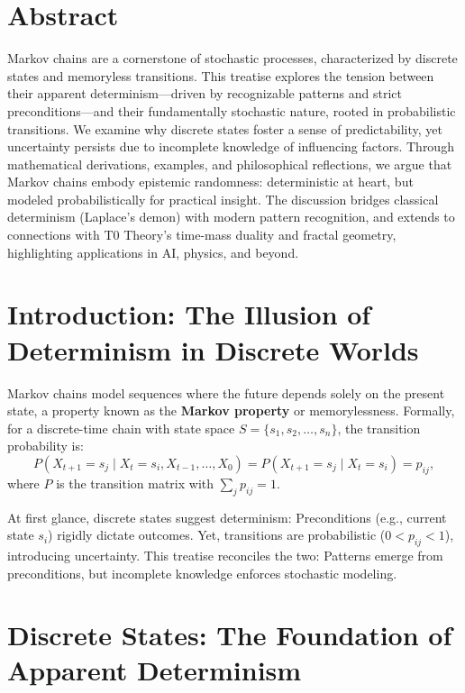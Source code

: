 \section*{Abstract}
		Markov chains are a cornerstone of stochastic processes, characterized by discrete states and memoryless transitions. This treatise explores the tension between their apparent determinism—driven by recognizable patterns and strict preconditions—and their fundamentally stochastic nature, rooted in probabilistic transitions. We examine why discrete states foster a sense of predictability, yet uncertainty persists due to incomplete knowledge of influencing factors. Through mathematical derivations, examples, and philosophical reflections, we argue that Markov chains embody epistemic randomness: deterministic at heart, but modeled probabilistically for practical insight. The discussion bridges classical determinism (Laplace's demon) with modern pattern recognition, and extends to connections with T0 Theory's time-mass duality and fractal geometry, highlighting applications in AI, physics, and beyond.

	
	
	\section{Introduction: The Illusion of Determinism in Discrete Worlds}
	\label{sec:intro}
	
	Markov chains model sequences where the future depends solely on the present state, a property known as the \textbf{Markov property} or memorylessness. Formally, for a discrete-time chain with state space $S = \{s_1, s_2, \dots, s_n\}$, the transition probability is:
	\begin{equation}
		P(X_{t+1} = s_j \mid X_t = s_i, X_{t-1}, \dots, X_0) = P(X_{t+1} = s_j \mid X_t = s_i) = p_{ij},
	\end{equation}
	where $P$ is the transition matrix with $\sum_j p_{ij} = 1$.
	
	At first glance, discrete states suggest determinism: Preconditions (e.g., current state $s_i$) rigidly dictate outcomes. Yet, transitions are probabilistic ($0 < p_{ij} < 1$), introducing uncertainty. This treatise reconciles the two: Patterns emerge from preconditions, but incomplete knowledge enforces stochastic modeling.
	
	\section{Discrete States: The Foundation of Apparent Determinism}
	\label{sec:discrete}
	
